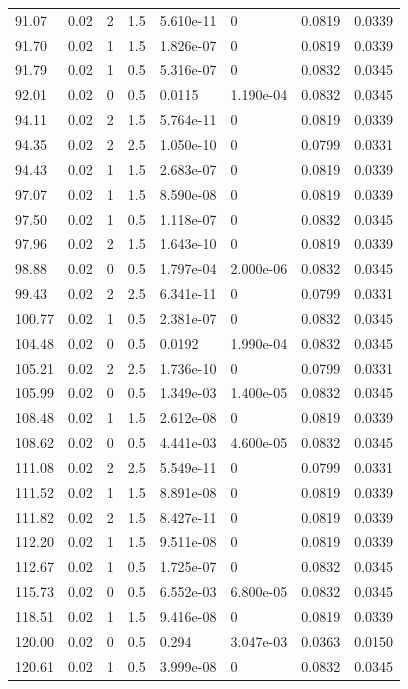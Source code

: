 \documentclass[preview]{standalone}
\begin{document}
{{{\begin{tabular}{L{1.2cm}C{1.2cm} C{0.3cm}C{0.5cm} C{1.4cm}C{1.4cm} C{1.4cm}C{1.4cm}}
  91.07  &  0.02  & 2     & 1.5 &  5.610e-11  & 0  & 0.0819 &  0.0339   \\ 
  91.70  &  0.02  & 1     & 1.5 &  1.826e-07  & 0  & 0.0819 &  0.0339   \\ 
  91.79  &  0.02  & 1     & 0.5 &  5.316e-07  & 0  & 0.0832 &  0.0345   \\ 
  92.01  &  0.02  & 0     & 0.5 &  0.0115  & 1.190e-04  & 0.0832 &  0.0345   \\ 
  94.11  &  0.02  & 2     & 1.5 &  5.764e-11  & 0  & 0.0819 &  0.0339   \\ 
  94.35  &  0.02  & 2     & 2.5 &  1.050e-10  & 0  & 0.0799 &  0.0331   \\ 
  94.43  &  0.02  & 1     & 1.5 &  2.683e-07  & 0  & 0.0819 &  0.0339   \\ 
  97.07  &  0.02  & 1     & 1.5 &  8.590e-08  & 0  & 0.0819 &  0.0339   \\ 
  97.50  &  0.02  & 1     & 0.5 &  1.118e-07  & 0  & 0.0832 &  0.0345   \\ 
  97.96  &  0.02  & 2     & 1.5 &  1.643e-10  & 0  & 0.0819 &  0.0339   \\ 
  98.88  &  0.02  & 0     & 0.5 &  1.797e-04  & 2.000e-06  & 0.0832 &  0.0345   \\ 
  99.43  &  0.02  & 2     & 2.5 &  6.341e-11  & 0  & 0.0799 &  0.0331   \\ 
  100.77  &  0.02  & 1     & 0.5 &  2.381e-07  & 0  & 0.0832 &  0.0345   \\ 
  104.48  &  0.02  & 0     & 0.5 &  0.0192  & 1.990e-04  & 0.0832 &  0.0345   \\ 
  105.21  &  0.02  & 2     & 2.5 &  1.736e-10  & 0  & 0.0799 &  0.0331   \\ 
  105.99  &  0.02  & 0     & 0.5 &  1.349e-03  & 1.400e-05  & 0.0832 &  0.0345   \\ 
  108.48  &  0.02  & 1     & 1.5 &  2.612e-08  & 0  & 0.0819 &  0.0339   \\ 
  108.62  &  0.02  & 0     & 0.5 &  4.441e-03  & 4.600e-05  & 0.0832 &  0.0345   \\ 
  111.08  &  0.02  & 2     & 2.5 &  5.549e-11  & 0  & 0.0799 &  0.0331   \\ 
  111.52  &  0.02  & 1     & 1.5 &  8.891e-08  & 0  & 0.0819 &  0.0339   \\ 
  111.82  &  0.02  & 2     & 1.5 &  8.427e-11  & 0  & 0.0819 &  0.0339   \\ 
  112.20  &  0.02  & 1     & 1.5 &  9.511e-08  & 0  & 0.0819 &  0.0339   \\ 
  112.67  &  0.02  & 1     & 0.5 &  1.725e-07  & 0  & 0.0832 &  0.0345   \\ 
  115.73  &  0.02  & 0     & 0.5 &  6.552e-03  & 6.800e-05  & 0.0832 &  0.0345   \\ 
  118.51  &  0.02  & 1     & 1.5 &  9.416e-08  & 0  & 0.0819 &  0.0339   \\ 
  120.00  &  0.02  & 0     & 0.5 &  0.294  & 3.047e-03  & 0.0363 &  0.0150   \\ 
  120.61  &  0.02  & 1     & 0.5 &  3.999e-08  & 0  & 0.0832 &  0.0345   \\ 
\hline 
\end{tabular} 

}}}
\end{document}
